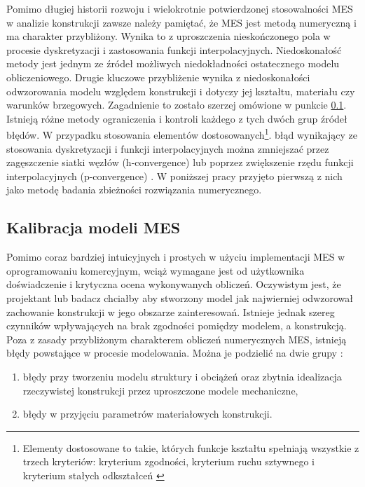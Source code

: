 Pomimo długiej historii rozwoju i wielokrotnie potwierdzonej stosowalności MES w analizie konstrukcji zawsze należy pamiętać, że MES jest metodą numeryczną i ma charakter przybliżony. Wynika to z uproszczenia nieskończonego pola w procesie dyskretyzacji i zastosowania funkcji interpolacyjnych. Niedoskonałość metody jest jednym ze źródeł możliwych niedokładności ostatecznego modelu obliczeniowego. Drugie kluczowe przybliżenie wynika z niedoskonałości odwzorowania modelu względem konstrukcji i dotyczy jej kształtu, materiału czy warunków brzegowych. Zagadnienie to zostało szerzej omówione w punkcie \ref{sect:calibration_model}. Istnieją różne metody ograniczenia i kontroli każdego z tych dwóch grup źródeł błędów. W przypadku stosowania elementów dostosowanych\footnote{
	Elementy dostosowane to takie, których funkcje kształtu spełniają wszystkie z trzech kryteriów: kryterium zgodności, kryterium ruchu sztywnego i kryterium stałych odkształceń \parencite{Rakowski2016}}.
błąd wynikający ze stosowania dyskretyzacji i funkcji interpolacyjnych można zmniejszać przez zagęszczenie siatki węzłów (h-convergence) lub poprzez zwiększenie rzędu funkcji interpolacyjnych (p-convergence) \parencite{Zienkiewicz2005}. W poniższej pracy przyjęto pierwszą z nich jako metodę badania zbieżności rozwiązania numerycznego.

\subsection{Kalibracja modeli MES} \label{sect:calibration_model}
Pomimo coraz bardziej intuicyjnych i prostych w użyciu implementacji MES w oprogramowaniu komercyjnym, wciąż wymagane jest od użytkownika doświadczenie i krytyczna ocena wykonywanych obliczeń. Oczywistym jest, że projektant lub badacz chciałby aby stworzony model jak najwierniej odwzorował zachowanie konstrukcji w jego obszarze zainteresowań. Istnieje jednak szereg czynników wpływających na brak zgodności pomiędzy modelem, a konstrukcją. Poza z zasady przybliżonym charakterem obliczeń numerycznych MES, istnieją błędy powstające w procesie modelowania. Można je podzielić na dwie grupy \parencite{Mottershead1993,Mottershead2011}:
\begin{enumerate}
	\item błędy przy tworzeniu modelu struktury i obciążeń oraz zbytnia idealizacja rzeczywistej konstrukcji przez uproszczone modele mechaniczne,
	\item błędy w przyjęciu parametrów materiałowych konstrukcji.
\end{enumerate}

